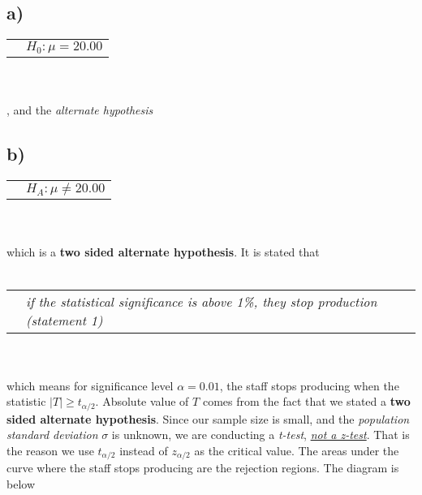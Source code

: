\documentclass[12pt]{article}
\begin{document}
\subsection*{a)}
\begin{tabular}{l l}
    &$H_0: \mu = 20.00$\\
\end{tabular}
\\ \\
, and the \textit{alternate hypothesis} 
\subsection*{b)}
\begin{tabular}{l l}
    &$H_A: \mu \neq 20.00$\\
\end{tabular}
\\ \\
which is a \textbf{two sided alternate hypothesis}.
It is stated that 
\\ \\
\begin{tabular}{l l}
    &\textit{if the statistical significance is above 1\%, they stop production} \hypertarget{stat1}{\textit{(statement 1)}}\\
\end{tabular}
\\ \\
which means for significance level $\alpha=0.01$, 
the staff stops producing when the statistic
$|T| \geq t_{\alpha/2}$. Absolute value of $T$ 
comes from the fact that we stated a 
\textbf{two sided alternate hypothesis}.
Since our sample size is small, and the \textit{population 
standard deviation} $\sigma$ is unknown, we are conducting a
\textit{t-test}, \underline{\textit{not a z-test}}.
That is the reason we use $t_{\alpha/2}$ instead of
$z_{\alpha/2}$ as the critical value.
The areas under the curve where the staff stops
producing are the rejection regions. The diagram is below
\\ \\
\end{document}
